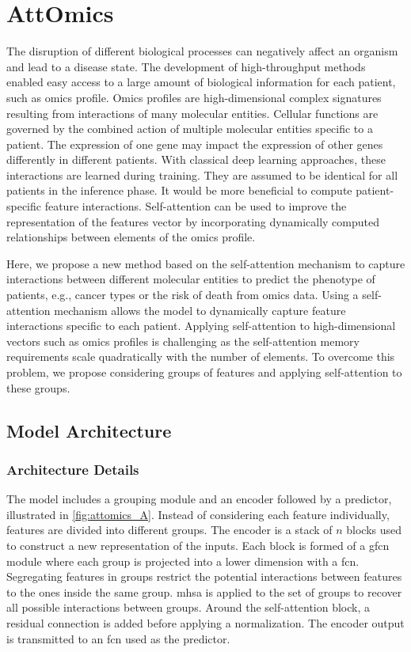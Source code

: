 \documentclass[../main.tex]{subfiles}
\begin{document}
\chapter{AttOmics}\label{chap:attomics}
\minitocpage

The disruption of different biological processes can negatively affect an organism and lead to a disease state.
The development of high-throughput methods enabled easy access to a large amount of biological information for each patient, such as omics profile.
Omics profiles are high-dimensional complex signatures resulting from interactions of many molecular entities.
Cellular functions are governed by the combined action of multiple molecular entities specific to a patient.
The expression of one gene may impact the expression of other genes differently in different patients.
With classical deep learning approaches, these interactions are learned during training.
They are assumed to be identical for all patients in the inference phase.
It would be more beneficial to compute patient-specific feature interactions.
Self-attention can be used to improve the representation of the features vector by incorporating dynamically computed relationships between elements of the omics profile.

Here, we propose a new method based on the self-attention mechanism to capture interactions between different molecular entities to predict the phenotype of patients, e.g., cancer types or the risk of death from omics data.
Using a self-attention mechanism allows the model to dynamically capture feature interactions specific to each patient.
Applying self-attention to high-dimensional vectors such as omics profiles is challenging as the self-attention memory requirements scale quadratically with the number of elements.
To overcome this problem, we propose considering groups of features and applying self-attention to these groups.

\section{Model Architecture}
	\subsection{Architecture Details}
		The model includes a grouping module and an encoder followed by a predictor, illustrated in \cref{fig:attomics_A}.
		Instead of considering each feature individually, features are divided into different groups.
		The encoder is a stack of \(n\) blocks used to construct a new representation of the inputs.
		Each block is formed of a \gls{gfcn} module where each group is projected into a lower dimension with a \gls{fcn}.
		Segregating features in groups restrict the potential interactions between features to the ones inside the same group.
		\Gls{mhsa} is applied to the set of groups to recover all possible interactions between groups.
		Around the self-attention block, a residual connection is added before applying a normalization.
		The encoder output is transmitted to an \gls{fcn} used as the predictor.
\end{document}
